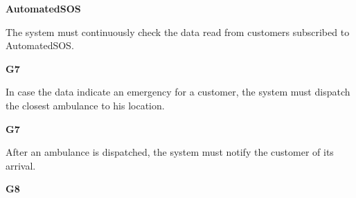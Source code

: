 \documentclass[../main.tex]{subfiles}
\begin{document}
\begin{minipage}{\textwidth}
{\bf AutomatedSOS}
\begin{description}
	\item [R8] The system must continuously check the data read from customers subscribed to AutomatedSOS.
	\item \begin{flushright}{\bf{G7}}\end{flushright}

	\item [R9] In case the data indicate an emergency for a customer, the system must dispatch the closest ambulance to his location.
	\item \begin{flushright}{\bf{G7}}\end{flushright}

	\item [R10] After an ambulance is dispatched, the system must notify the customer of its arrival.
	\item \begin{flushright}{\bf{G8}}\end{flushright}

\end{description}
\end{minipage}
\vspace{8mm}
\end{document}
